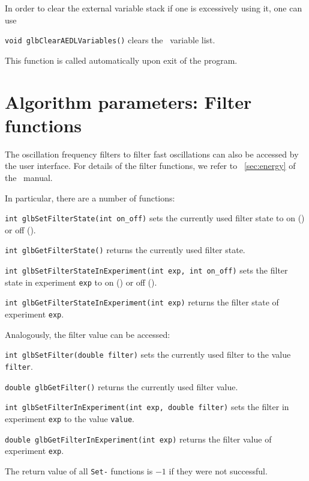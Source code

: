 In order to clear the external variable stack if one is
excessively using it, one can use
\begin{function}
{\tt void glbClearAEDLVariables()}
clears the \AEDL\ variable list.
\end{function}
This function is called automatically upon exit of the program.

\section{Algorithm parameters: Filter functions}

The oscillation frequency filters to filter fast oscillations
can also be accessed by the user interface. For details of
the filter functions, we refer to \Sec~\ref{sec:energy} of
the \AEDL\ manual.

In particular, there are a number of functions:
\begin{function}
{\tt int glbSetFilterState(int on\_off)} sets the currently
used filter state to on () or off ().
\end{function}
\begin{function}
{\tt int glbGetFilterState()} returns the currently used filter state.
\end{function}
\begin{function}
{\tt int glbSetFilterStateInExperiment(int exp, int on\_off)} sets the filter state in experiment {\tt exp} to on () or off ().
\end{function}
\begin{function}
{\tt int glbGetFilterStateInExperiment(int exp)} returns the filter state of experiment {\tt exp}.
\end{function}
Analogously, the filter value can be accessed:
\begin{function}
{\tt int glbSetFilter(double filter)} sets the currently used filter to the
value {\tt filter}.
\end{function}
\begin{function}
{\tt double glbGetFilter()} returns the currently used filter value.
\end{function}
\begin{function}
{\tt int glbSetFilterInExperiment(int exp, double filter)} sets the filter  in experiment {\tt exp} to the value {\tt value}.
\end{function}
\begin{function}
{\tt double glbGetFilterInExperiment(int exp)} returns the filter value of experiment {\tt exp}.
\end{function}
The return value of all {\tt Set-} functions is $-1$ if they were not successful.

